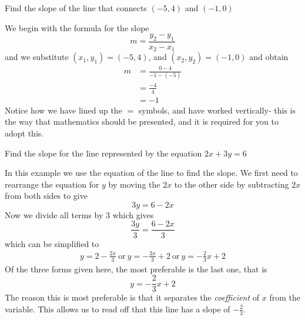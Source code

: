 \begin{myexample}
Find the slope of the line that connects $(-5, 4)$ and $(-1, 0)$
\end{myexample}
\begin{myProof}
	We begin with the formula for the slope
	\[
		m = \frac{y_2-y_1}{x_2-x_1}
	\]
	and we substitute $(x_1,y_1) = (-5,4)$, and $(x_2,y_2) = (-1,0)$ and obtain
	\begin{align*}
		m & =	 	\frac{0-4}{-1-(-5)} \\
		  & =		\frac{-4}{4}         \\
		  & =		-1                   
	\end{align*}
	Notice how we have lined up the $=$ symbols, and have worked vertically- this is the way
	that mathematics should be presented, and it is required for you to adopt this.
\end{myProof}
				
\begin{myexample}
Find the slope for the line represented by the equation $2x+3y=6$
\end{myexample}
\begin{myProof}
	In this example we use the equation of the line to find the slope. We first need to rearrange the equation for $y$ by moving the $2x$ to the other side by subtracting $2x$ from 
	both sides to give
	\[
		3y = 6- 2x
	\]
	Now we divide all terms by $3$ which gives
	\[
		\frac{3y}{3} = \frac{6-2x}{3}
	\]
	which can be simplified to
	\begin{align*}
		y = 2-\frac{2x}{3} ~\textrm{or}~ y = -\frac{2x}{3}+2 ~\textrm{or}~ y=-\frac{2}{3}x+2 
	\end{align*}
	Of the three forms given here, the most preferable is the last one, that is
	\[
		y = -\frac{2}{3}x +2
	\]
	The reason this is most preferable is that it separates the {\em \gls{coefficient}} of $x$ from the \gls{variable}. 
	This allows us to read off that this line has a slope of $-\frac{2}{3}$.
\end{myProof}
									
